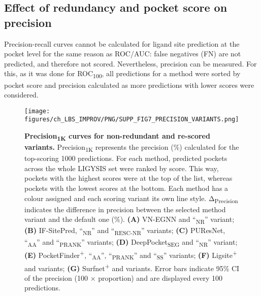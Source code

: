 \subsection{Effect of redundancy and pocket score on precision}

Precision-recall curves cannot be calculated for ligand site prediction at the pocket level for the same reason as ROC/AUC: false negatives (FN) are not predicted, and therefore not scored. Nevertheless, precision can be measured. For this, as it was done for ROC\textsubscript{100}, all predictions for a method were sorted by pocket score and precision calculated as more predictions with lower scores were considered.

\begin{figure}[ht!]
    \centering
    \texttt{[image: figures/ch\_LBS\_IMPROV/PNG/SUPP\_FIG7\_PRECISION\_VARIANTS.png]}
    \caption[Precision\textsubscript{1K} curves for non-redundant and re-scored variants]{\textbf{Precision\textsubscript{1K} curves for non-redundant and re-scored variants.}  Precision\textsubscript{1K} represents the precision (\%) calculated for the top-scoring 1000 predictions. For each method, predicted pockets across the whole LIGYSIS set were ranked by score. This way, pockets with the highest scores were at the top of the list, whereas pockets with the lowest scores at the bottom. Each method has a colour assigned and each scoring variant its own line style. Δ\textsubscript{Precision} indicates the difference in precision between the selected method variant and the default one (\%).  \textbf{(A)} VN-EGNN and ``\textsubscript{NR}'' variant; \textbf{(B)} IF-SitePred, ``\textsubscript{NR}'' and ``\textsubscript{RESC-NR}'' variants; \textbf{(C)} PUResNet, ``\textsubscript{AA}'' and ``\textsubscript{PRANK}'' variants; \textbf{(D)} DeepPocket\textsubscript{SEG} and ``\textsubscript{NR}'' variant; \textbf{(E)} PocketFinder\textsuperscript{+}, ``\textsubscript{AA}'', ``\textsubscript{PRANK}'' and ``\textsubscript{SS}'' variants; \textbf{(F)} Ligsite\textsuperscript{+} and variants; \textbf{(G)} Surfnet\textsuperscript{+} and variants. Error bars indicate 95\% CI of the precision (100 $\times$ proportion) and are displayed every 100 predictions.}
    \label{fig:pocket_precision_variants}
\end{figure}

